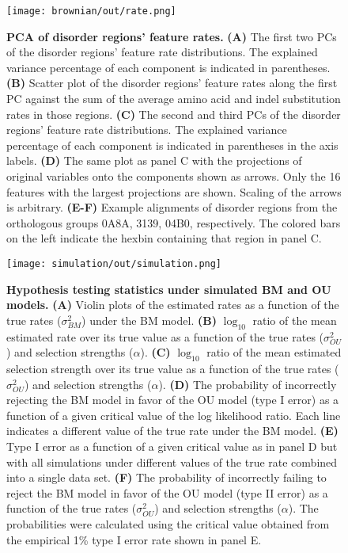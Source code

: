 \begin{figure}[h!]
\texttt{[image: brownian/out/rate.png]}
\centering
\caption{\textbf{PCA of disorder regions' feature rates.}
\textbf{(A)} The first two PCs of the disorder regions' feature rate distributions. The explained variance percentage of each component is indicated in parentheses.
\textbf{(B)} Scatter plot of the disorder regions' feature rates along the first PC against the sum of the average amino acid and indel substitution rates in those regions.
\textbf{(C)} The second and third PCs of the disorder regions' feature rate distributions. The explained variance percentage of each component is indicated in parentheses in the axis labels.
\textbf{(D)} The same plot as panel C with the projections of original variables onto the components shown as arrows. Only the 16 features with the largest projections are shown. Scaling of the arrows is arbitrary.
\textbf{(E-F)} Example alignments of disorder regions from the orthologous groups 0A8A, 3139, 04B0, respectively. The colored bars on the left indicate the hexbin containing that region in panel C.}
\label{fig:rate}
\end{figure}

\begin{figure}[h!]
\texttt{[image: simulation/out/simulation.png]}
\centering
\caption{\textbf{Hypothesis testing statistics under simulated BM and OU models.}
\textbf{(A)} Violin plots of the estimated rates as a function of the true rates ($\sigma^2_{BM}$) under the BM model.
\textbf{(B)} $\log_{10}$ ratio of the mean estimated rate over its true value as a function of the true rates ($\sigma^2_{OU}$) and selection strengths ($\alpha$).
\textbf{(C)} $\log_{10}$ ratio of the mean estimated selection strength over its true value as a function of the true rates ($\sigma^2_{OU}$) and selection strengths ($\alpha$).
\textbf{(D)} The probability of incorrectly rejecting the BM model in favor of the OU model (type I error) as a function of a given critical value of the log likelihood ratio. Each line indicates a different value of the true rate under the BM model.
\textbf{(E)} Type I error as a function of a given critical value as in panel D but with all simulations under different values of the true rate combined into a single data set.
\textbf{(F)} The probability of incorrectly failing to reject the BM model in favor of the OU model (type II error) as a function of the true rates ($\sigma^2_{OU}$) and selection strengths ($\alpha$). The probabilities were calculated using the critical value obtained from the empirical 1\% type I error rate shown in panel E.}
\label{fig:simulation}
\end{figure}

